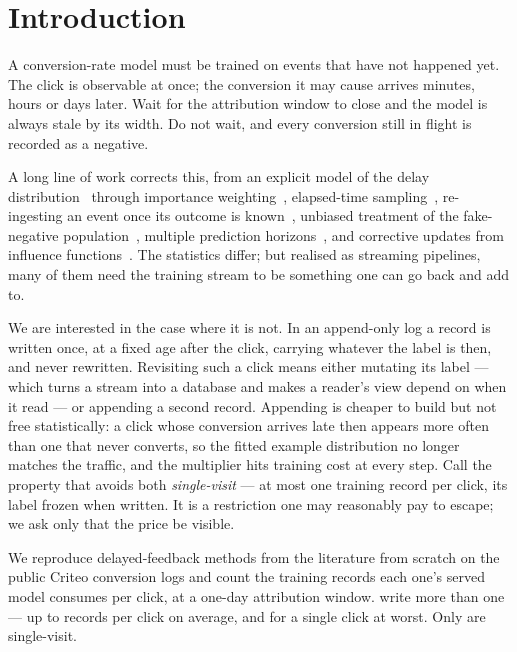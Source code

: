 \section{Introduction}
\label{sec:intro}

A conversion-rate model must be trained on events that have not happened yet. The click is
observable at once; the conversion it may cause arrives minutes, hours or days later. Wait for
the attribution window to close and the model is always stale by its width. Do not wait, and
every conversion still in flight is recorded as a negative.

A long line of work corrects this, from an explicit model of the delay
distribution~\cite{chapelle2014modeling} through importance weighting~\cite{yasui2020feedback},
elapsed-time sampling~\cite{yang2021capturing}, re-ingesting an event once its outcome is
known~\cite{ktena2019addressing,gu2021real}, unbiased treatment of the fake-negative
population~\cite{chen2022asymptotically}, multiple prediction
horizons~\cite{li2021follow,liu2024online,zhang2025personalized}, and corrective updates from
influence functions~\cite{ding2026delayed}. The statistics differ; but realised as streaming
pipelines, many of them need the training stream to be something one can go back and add to.

We are interested in the case where it is not. In an append-only log a record is written
once, at a fixed age after the click, carrying whatever the label is then, and never rewritten.
Revisiting such a click means either mutating its label --- which turns a stream into a
database and makes a reader's view depend on when it read --- or appending a second record.
Appending is cheaper to build but not free statistically: a click whose conversion arrives late
then appears more often than one that never converts, so the fitted example distribution no
longer matches the traffic, and the multiplier hits training cost at every step. Call the property that avoids both
\emph{single-visit} --- at most one training record per click, its label frozen when written.
It is a restriction one may reasonably pay to escape; we ask only that the price be visible.

We reproduce \nScreened{} delayed-feedback methods from the literature from scratch on the
public Criteo conversion logs and count the training records each one's served model consumes
per click, at a one-day attribution window. \nFail{} write more than one --- up to \maxDup{}
records per click on average, and \maxVisits{} for a single click at worst. Only \passList{}
are single-visit.

